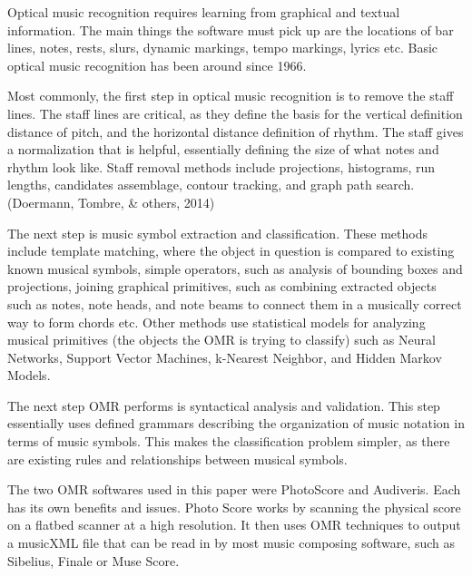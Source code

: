 \documentclass[12pt,twoside]{reedthesis}
\theoremstyle{definition}
\theoremstyle{definition}
\theoremstyle{definition}
\theoremstyle{remark}
\begin{document}
Optical music recognition requires learning from graphical and textual
information. The main things the software must pick up are the locations
of bar lines, notes, rests, slurs, dynamic markings, tempo markings,
lyrics etc. Basic optical music recognition has been around since 1966.

Most commonly, the first step in optical music recognition is to remove
the staff lines. The staff lines are critical, as they define the basis
for the vertical definition distance of pitch, and the horizontal
distance definition of rhythm. The staff gives a normalization that is
helpful, essentially defining the size of what notes and rhythm look
like. Staff removal methods include projections, histograms, run
lengths, candidates assemblage, contour tracking, and graph path search.
(Doermann, Tombre, \& others, 2014)

The next step is music symbol extraction and classification. These
methods include template matching, where the object in question is
compared to existing known musical symbols, simple operators, such as
analysis of bounding boxes and projections, joining graphical
primitives, such as combining extracted objects such as notes, note
heads, and note beams to connect them in a musically correct way to form
chords etc. Other methods use statistical models for analyzing musical
primitives (the objects the OMR is trying to classify) such as Neural
Networks, Support Vector Machines, k-Nearest Neighbor, and Hidden Markov
Models.

The next step OMR performs is syntactical analysis and validation. This
step essentially uses defined grammars describing the organization of
music notation in terms of music symbols. This makes the classification
problem simpler, as there are existing rules and relationships between
musical symbols.

The two OMR softwares used in this paper were PhotoScore and Audiveris.
Each has its own benefits and issues. Photo Score works by scanning the
physical score on a flatbed scanner at a high resolution. It then uses
OMR techniques to output a musicXML file that can be read in by most
music composing software, such as Sibelius, Finale or Muse Score.
\end{document}
